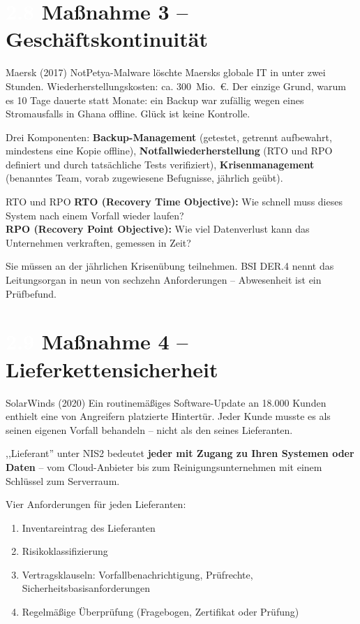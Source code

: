 \documentclass[11pt,a4paper,twoside]{book}
\newcommand{\lessontag}[1]{%
  \texorpdfstring{%
    \setlength{\fboxsep}{3pt}\colorbox{nisd2blue}{\textcolor{white}{\footnotesize\bfseries #1}}\quad%
  }{Lektion #1\ }%
}
\begin{document}
\section{\lessontag{2.8}Maßnahme 3 -- Geschäftskontinuität}

\begin{casestudy}{Maersk (2017)}
NotPetya-Malware löschte Maersks globale IT in unter zwei Stunden. Wiederherstellungskosten: ca. 300~Mio.~\euro{}. Der einzige Grund, warum es 10 Tage dauerte statt Monate: ein Backup war zufällig wegen eines Stromausfalls in Ghana offline. Glück ist keine Kontrolle.
\end{casestudy}

Drei Komponenten: \textbf{Backup-Management} (getestet, getrennt aufbewahrt, mindestens eine Kopie offline), \textbf{Notfallwiederherstellung} (RTO und RPO definiert und durch tatsächliche Tests verifiziert), \textbf{Krisenmanagement} (benanntes Team, vorab zugewiesene Befugnisse, jährlich geübt).

\begin{definitionbox}{RTO und RPO}
\textbf{RTO (Recovery Time Objective):} Wie schnell muss dieses System nach einem Vorfall wieder laufen? \\
\textbf{RPO (Recovery Point Objective):} Wie viel Datenverlust kann das Unternehmen verkraften, gemessen in Zeit?
\end{definitionbox}

Sie müssen an der jährlichen Krisenübung teilnehmen. BSI DER.4 nennt das Leitungsorgan in neun von sechzehn Anforderungen -- Abwesenheit ist ein Prüfbefund.

\section{\lessontag{2.9}Maßnahme 4 -- Lieferkettensicherheit}

\begin{casestudy}{SolarWinds (2020)}
Ein routinemäßiges Software-Update an 18.000 Kunden enthielt eine von Angreifern platzierte Hintertür. Jeder Kunde musste es als seinen eigenen Vorfall behandeln -- nicht als den seines Lieferanten.
\end{casestudy}

,,Lieferant'' unter NIS2 bedeutet \textbf{jeder mit Zugang zu Ihren Systemen oder Daten} -- vom Cloud-Anbieter bis zum Reinigungsunternehmen mit einem Schlüssel zum Serverraum.

Vier Anforderungen für jeden Lieferanten:
\begin{enumerate}
  \item Inventareintrag des Lieferanten
  \item Risikoklassifizierung
  \item Vertragsklauseln: Vorfallbenachrichtigung, Prüfrechte, Sicherheitsbasisanforderungen
  \item Regelmäßige Überprüfung (Fragebogen, Zertifikat oder Prüfung)
\end{enumerate}
\end{document}
